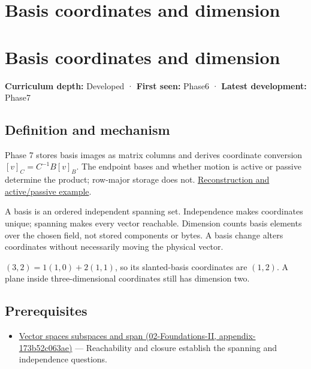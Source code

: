 \hypertarget{appendix-ce0341f7ea0d}{}
\section*{Basis coordinates and dimension}
\section{Basis coordinates and dimension}\label{appendix-ce0341f7ea0d-basis-coordinates-and-dimension}

\textbf{Curriculum depth:} Developed · \textbf{First seen:} Phase6 · \textbf{Latest development:} Phase7

\subsection{Definition and mechanism}\label{appendix-ce0341f7ea0d-definition-and-mechanism}

Phase 7 stores basis images as matrix columns and derives coordinate conversion \([v]_C=C^{-1}B[v]_B\). The endpoint bases and whether motion is active or passive determine the product; row-major storage does not. \hyperref[01-foundations-i-ch019-coordinates-can-change-while-the-geometric-object-stays-still]{Reconstruction and active/passive example}.

A basis is an ordered independent spanning set. Independence makes coordinates unique; spanning makes every vector reachable. Dimension counts basis elements over the chosen field, not stored components or bytes. A basis change alters coordinates without necessarily moving the physical vector.

\((3,2)=1(1,0)+2(1,1)\), so its slanted-basis coordinates are \((1,2)\). A plane inside three-dimensional coordinates still has dimension two.

\subsection{Prerequisites}\label{appendix-ce0341f7ea0d-prerequisites}

\begin{itemize}
\tightlist
\item
  \href{../02-Foundations-II/main.pdf\#nameddest=appendix-173b52c063ae}{Vector spaces subspaces and span (02-Foundations-II, appendix-173b52c063ae)} --- Reachability and closure establish the spanning and independence questions.
\end{itemize}

